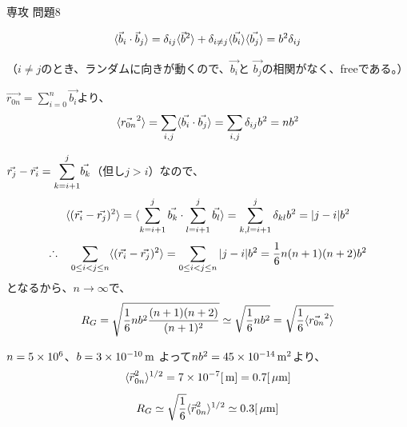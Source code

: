 \documentclass[fleqn]{jbook}
\begin{document}
\begin{answer}{専攻 問題8}{}

\begin{subanswers}
\SubAnswer


   \[ \langle{\vec{b}_i \cdot \vec{b}_j}\rangle
       = \delta_{i j}\langle{\vec{b}^2}\rangle+
        \delta_{i\neq j}\langle{\vec{b_i}}\rangle\langle{\vec{b_j}}\rangle 
      =b^2\delta_{ij} \]

   （\Naze $i\neq j$のとき、ランダムに向きが動くので、$\vec{b_i}$と
        $\vec{b_j}$の相関がなく、freeである。） 

\SubAnswer

  $\vec{r_{0n}}=\sum_{i=0}^{n}\vec{b_i}$より、
   \[ \langle{\vec{r_{0n}}^2}\rangle
      =\sum_{i,j}\langle{\vec{b_i}\cdot \vec{b_j}}\rangle
      =\sum_{i,j} \delta_{i j}b^2 
      =nb^2 
   \]
  
%

\SubAnswer

   $\vec{r_j}-\vec{r_i}=\displaystyle{\sum_{k=i+1}^j}\vec{b_k}$（但し$j>i$）なので、
     \[ \langle{(\vec{r_i}-\vec{r_j})^2}\rangle=
         \langle{\sum_{k=i+1}^{j}\vec{b_k}\cdot \sum_{l=i+1}^{j}\vec{b_l}}\rangle
         =\sum_{k,l=i+1}^{j}\delta_{k l} b^2 =|j-i|b^2 \]
     \[ \Yueni \sum_{0\leq i< j \leq n}\Mean{(\vec{r_i}-\vec{r_j})^2}
        =\sum_{0\leq i<j \leq n} |j-i|b^2 =\frac{1}{6}n(n+1)(n+2)b^2 \]
    となるから、$n\rightarrow \infty$で、
    \[ R_G=\sqrt{\frac{1}{6}nb^2 \frac{(n+1)(n+2)}{(n+1)^2}}
       \simeq \sqrt{\frac{1}{6}nb^2}=\sqrt{\frac{1}{6}\langle{\vec{r_{0n}}^2}\rangle}\] 

%
%
%
%
%
%


\SubAnswer
  $n=5\times 10^{6}$、$b=3\times 10^{-10}\,{\rm m}$
  よって$nb^2=45\times 10^{-14}\,{\rm m^2}$より、
%
  \[ \Mean{\vec{r{}}_{0n}^2}^{1/2}%
     = 7\Keta{-7}[\Unit{m}] = 0.7 [\Unit{\mu m}] \]
  \[ R_G \simeq \sqrt{\frac{1}{6}}\langle{\vec{r{}}_{0n}^2}\rangle^{1/2}
               \simeq 0.3[\,{\rm \mu m}] \]
%


\end{subanswers}
\end{answer}
\end{document}
